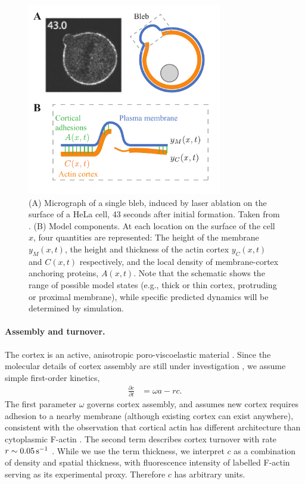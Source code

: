 \begin{figure}
   \begin{center}
   \captionsetup{width=8.5cm}
	\includegraphics*[width=8.5cm]{Project1/figs/figure1.pdf}
      \caption{(A) Micrograph of a single bleb, induced by laser ablation on the surface of a HeLa cell, 43 seconds after initial formation. Taken from \cite{Biro:2013bk}. (B) Model components. At each location on the surface of the cell $x$, four quantities are represented: The height of the membrane $y_M(x,t)$, the height and thickness of the actin cortex $y_C(x,t)$ and $C(x,t)$ respectively, and the local density of membrane-cortex anchoring proteins, $A(x,t)$. Note that the schematic shows the range of possible model states (e.g., thick or thin cortex, protruding or proximal membrane), while specific predicted dynamics will be determined by simulation.}
      \label{fig::schematic}
   \end{center}
\end{figure}

\paragraph{Assembly and turnover.}
The cortex is an active, anisotropic poro-viscoelastic material \cite{Salbreux:2009fp,Hannezo:2015ba}. Since the molecular details of cortex assembly are still under investigation \cite{Bovellan:2014ka}, we assume simple first-order kinetics,
\begin{align}
\frac{\partial c}{\partial t} &= \omega a - r c. \label{eq::cortexKinetics}
\end{align}
The first parameter $\omega$ governs cortex assembly, and assumes new cortex requires adhesion to a nearby membrane (although existing cortex can exist anywhere), consistent with the observation that cortical actin has different architecture than cytoplasmic F-actin \cite{Clark:2013ef}. The second term describes cortex turnover with rate $r \sim 0.05 \,\mbox{s}^{-1}$ \cite{Fritzsche:2014jw}. While we use the term thickness, we interpret $c$ as a combination of density and spatial thickness, with fluorescence intensity of labelled F-actin serving as its experimental proxy. Therefore $c$ has arbitrary units.

